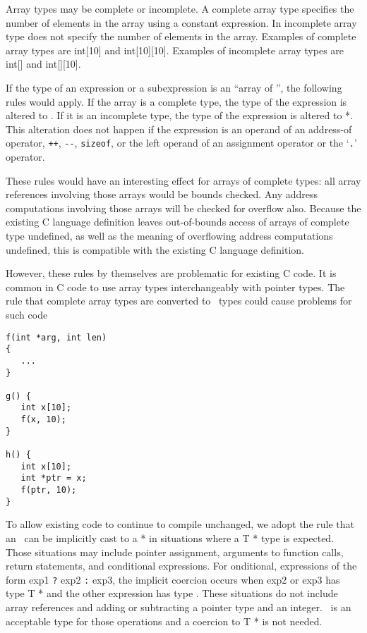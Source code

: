 Array types may be complete or incomplete. A complete array type
specifies the number of elements in the array using a constant
expression. In incomplete array type does not specify the number of
elements in the array. Examples of complete array types are int[10]
and int[10][10]. Examples of incomplete array types are
int[] and int[][10].

If the type of an expression or a subexpression is an ``array of
'', the following rules would apply. If the array is a complete
type, the type of the expression is altered to
\arrayptrT . If it is
an incomplete type, the type of the expression is altered to  *.
This alteration does not happen if the expression is an operand of an
address-of operator, \texttt{++}, \texttt{-\/-}, \texttt{sizeof}, or the
left operand of an assignment operator or the `\texttt{.}' operator.

These rules would have an interesting effect for arrays of complete
types: all array references involving those arrays would be bounds
checked. Any address computations involving those arrays will be checked
for overflow also. Because the existing C language definition leaves
out-of-bounds access of arrays of complete type undefined, as well as
the meaning of overflowing address computations undefined, this is
compatible with the existing C language definition.

However, these rules by themselves are problematic for existing C code.
It is common in C code to use array types interchangeably with pointer
types. The rule that complete array types are converted to
\arrayptr\ types could cause problems for such code

\begin{verbatim}
f(int *arg, int len)
{ 
   ...
}

g() {
   int x[10];
   f(x, 10);
}

h() {
   int x[10];
   int *ptr = x;
   f(ptr, 10);
}
\end{verbatim}

To allow existing code to continue to compile unchanged, we adopt the
rule that an \arrayptrT\ can be
implicitly cast to a  * in situations where a T * type is
expected. Those situations may include pointer assignment, arguments to
function calls, return statements, and conditional expressions. For
onditional, expressions of the form exp1 \texttt{?} exp2 \texttt{:}
exp3, the implicit coercion occurs when exp2 or exp3 has type T * and
the other expression has type
\arrayptrT. These situations do not
include array references and adding or subtracting a pointer type and an
integer. \arrayptrT\ is an acceptable
type for those operations and a coercion to T * is not needed.

